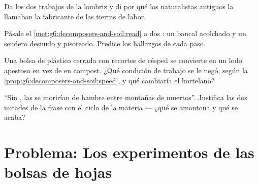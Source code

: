 \begin{exercise}[$\star\star$]\label{exo:g6:decomposers-and-soil:9}
Da los dos trabajos de la lombriz y di por qué los naturalistas
antiguos la llamaban la fabricante de las tierras de labor.
\end{exercise}

\begin{exercise}[$\star\star$]\label{exo:g6:decomposers-and-soil:10}
Pásale el \cref{met:g6:decomposers-and-soil:read} a dos : un
bancal acolchado y un sendero desnudo y pisoteado. Predice los
hallazgos de cada paso.
\end{exercise}

\begin{exercise}[$\star\star$]\label{exo:g6:decomposers-and-soil:11}
Una bolsa de plástico cerrada con recortes de césped se convierte en un
lodo apestoso en vez de en compost. ¿Qué condición de trabajo se le
negó, según la \cref{prop:g6:decomposers-and-soil:speed}, y qué
cambiaría el hortelano?
\end{exercise}

\begin{exercise}[$\star\star\star$]\label{exo:g6:decomposers-and-soil:12}
``Sin , las  se morirían de hambre entre
montañas de muertos''. Justifica las dos mitades de la frase con el
ciclo de la materia --- ¿qué se amontona y qué se acaba?
\end{exercise}

\section{Problema: Los experimentos de las bolsas de hojas}


